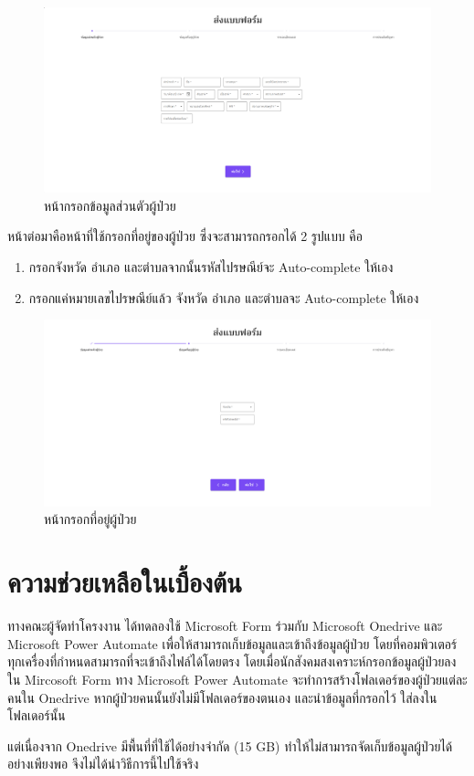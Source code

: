 \begin{figure}[H]
    \begin{center}
        \includegraphics[width=1\textwidth]{Screenshot 2025-03-06 200233.png}
    \end{center}
    \caption[หน้ากรอกข้อมูลส่วนตัวผู้ป่วย]{หน้ากรอกข้อมูลส่วนตัวผู้ป่วย}
\end{figure}
\newpage
หน้าต่อมาคือหน้าที่ใช้กรอกที่อยู่ของผู้ป่วย ซึ่งจะสามารถกรอกได้ 2 รูปแบบ คือ
\begin{enumerate}
    \item กรอกจังหวัด อำเภอ และตำบลจากนั้นรหัสไปรษณีย์จะ Auto-complete ให้เอง
    \item กรอกแค่หมายเลขไปรษณีย์แล้ว จังหวัด อำเภอ และตำบลจะ Auto-complete ให้เอง 
\end{enumerate}
\begin{figure}[H]
    \begin{center}
        \includegraphics[width=1\textwidth]{Screenshot 2025-03-06 200323.png}
    \end{center}
    \caption[หน้ากรอกที่อยู่ผู้ป่วย]{หน้ากรอกที่อยู่ผู้ป่วย}
\end{figure}

\section{ความช่วยเหลือในเบื้องต้น}

ทางคณะผู้จัดทำโครงงาน ได้ทดลองใช้ Microsoft Form ร่วมกับ Microsoft Onedrive และ Microsoft Power Automate เพื่อให้สามารถเก็บข้อมูลและเข้าถึงข้อมูลผู้ป่วย โดยที่คอมพิวเตอร์ทุกเครื่องที่กำหนดสามารถที่จะเข้าถึงไฟล์ได้โดยตรง โดยเมื่อนักสังคมสงเคราะห์กรอกข้อมูลผู้ป่วยลงใน Mircosoft Form ทาง Microsoft Power Automate จะทำการสร้างโฟลเดอร์ของผู้ป่วยแต่ละคนใน Onedrive หากผู้ป่วยคนนั้นยังไม่มีโฟลเดอร์ของตนเอง และนำข้อมูลที่กรอกไว้ ใส่ลงในโฟลเดอร์นั้น

แต่เนื่องจาก Onedrive มีพื้นที่ที่ใช้ได้อย่างจำกัด (15 GB) ทำให้ไม่สามารถจัดเก็บข้อมูลผู้ป่วยได้อย่างเพียงพอ จึงไม่ได้นำวิธีการนี้ไปใช้จริง